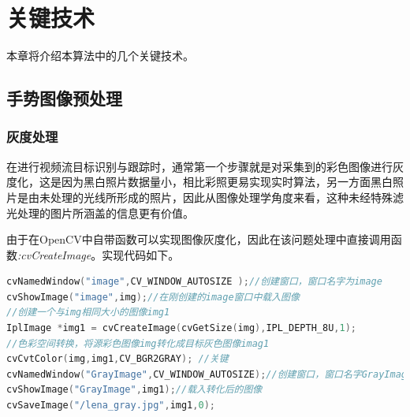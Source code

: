 \documentclass{XDBAthesis}
\begin{document}
\else
\fi
\chapter{关键技术}
本章将介绍本算法中的几个关键技术。


%

\section{手势图像预处理}

\subsection{灰度处理}

在进行视频流目标识别与跟踪时，通常第一个步骤就是对采集到的彩色图像进行灰度化\cite{黄柏林2002基于边界特征的人脸识别}，这是因为黑白照片数据量小，相比彩照更易实现实时算法，另一方面黑白照片是由未处理的光线所形成的照片，因此从图像处理学角度来看，这种未经特殊滤光处理的图片所涵盖的信息更有价值。

由于在OpenCV中自带函数可以实现图像灰度化，因此在该问题处理中直接调用函数\emph{:cvCreateImage}。实现代码如下。
\begin{lstlisting}[language=C]
cvNamedWindow("image",CV_WINDOW_AUTOSIZE );//创建窗口，窗口名字为image
cvShowImage("image",img);//在刚创建的image窗口中载入图像
//创建一个与img相同大小的图像img1
IplImage *img1 = cvCreateImage(cvGetSize(img),IPL_DEPTH_8U,1);
//色彩空间转换，将源彩色图像img转化成目标灰色图像imag1
cvCvtColor(img,img1,CV_BGR2GRAY); //关键
cvNamedWindow("GrayImage",CV_WINDOW_AUTOSIZE);//创建窗口，窗口名字GrayImage
cvShowImage("GrayImage",img1);//载入转化后的图像
cvSaveImage("/lena_gray.jpg",img1,0);
\end{lstlisting}
%
%
\end{document}
